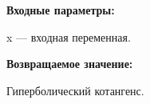 \textbf{Входные параметры:}

 x --- входная переменная.

\textbf{Возвращаемое значение:}

Гиперболический котангенс.